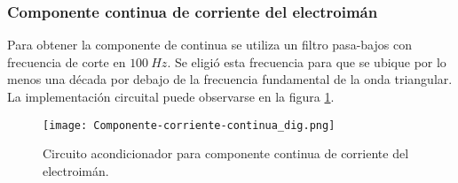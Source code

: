 %
%
%
%
%
%
%
%
%
%
%
%


\subsubsection{Componente continua de corriente del electroimán}

 Para obtener la componente de continua se utiliza un filtro pasa-bajos con frecuencia de corte en $100\:Hz$. Se eligió esta frecuencia para que se ubique por lo menos una década por debajo de la frecuencia fundamental de la onda triangular. La implementación circuital puede observarse en la figura \ref{fig:componente-corriente-continua}.


\begin{figure}[H]
	\centering
	\texttt{[image: Componente-corriente-continua\_dig.png]}
	\caption{Circuito acondicionador para componente continua de corriente del electroimán.
	}
	\label{fig:componente-corriente-continua}
\end{figure}

